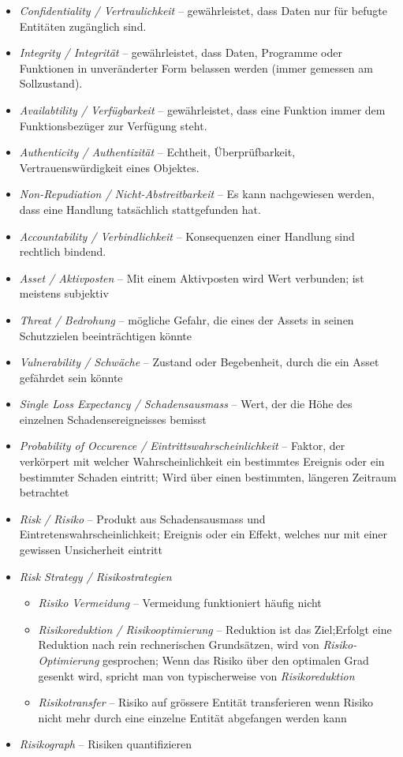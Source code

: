 \documentclass[a4paper,12pt]{article}
\begin{document}
\begin{itemize}
\item \emph{Confidentiality / Vertraulichkeit} -- gewährleistet, dass Daten nur für befugte Entitäten zugänglich sind.
\item \emph{Integrity / Integrität} -- gewährleistet, dass Daten, Programme oder Funktionen in unveränderter Form belassen werden (immer gemessen am Sollzustand).
\item \emph{Availabtility / Verfügbarkeit} -- gewährleistet, dass eine Funktion immer dem Funktionsbezüger zur Verfügung steht.
\item \emph{Authenticity / Authentizität} -- Echtheit, Überprüfbarkeit, Vertrauenswürdigkeit eines Objektes.
\item \emph{Non-Repudiation / Nicht-Abstreitbarkeit} -- Es kann nachgewiesen werden, dass eine Handlung tatsächlich stattgefunden hat.
\item \emph{Accountability / Verbindlichkeit} -- Konsequenzen einer Handlung sind rechtlich bindend.
\item \emph{Asset / Aktivposten} -- Mit einem Aktivposten wird Wert verbunden; ist meistens subjektiv
\item \emph{Threat / Bedrohung} -- mögliche Gefahr, die eines der Assets in seinen Schutzzielen beeinträchtigen könnte
\item \emph{Vulnerability / Schwäche} -- Zustand oder Begebenheit, durch die ein Asset gefährdet sein könnte
\item \emph{Single Loss Expectancy / Schadensausmass} -- Wert, der die Höhe des einzelnen Schadensereigneisses bemisst
\item \emph{Probability of Occurence / Eintrittswahrscheinlichkeit} -- Faktor, der verkörpert mit welcher Wahrscheinlichkeit ein bestimmtes Ereignis oder ein bestimmter Schaden eintritt; Wird über einen bestimmten, längeren Zeitraum betrachtet
\item \emph{Risk / Risiko} -- Produkt aus Schadensausmass und Eintretenswahrscheinlichkeit; Ereignis oder ein Effekt, welches nur mit einer gewissen Unsicherheit eintritt
\item \emph{Risk Strategy / Risikostrategien}
	\begin{itemize}
	\item \emph{Risiko Vermeidung} -- Vermeidung funktioniert häufig nicht
	\item \emph{Risikoreduktion / Risikooptimierung} -- Reduktion ist das Ziel;Erfolgt eine Reduktion nach rein rechnerischen Grundsätzen, wird von \emph{Risiko-Optimierung} gesprochen; Wenn das Risiko über den optimalen Grad gesenkt wird, spricht man von typischerweise von \emph{Risikoreduktion}
	\item \emph{Risikotransfer} -- Risiko auf grössere Entität transferieren wenn Risiko nicht mehr durch eine einzelne Entität abgefangen werden kann
	\end{itemize}
\item \emph{Risikograph} -- Risiken quantifizieren
\end{itemize}
\end{document}
